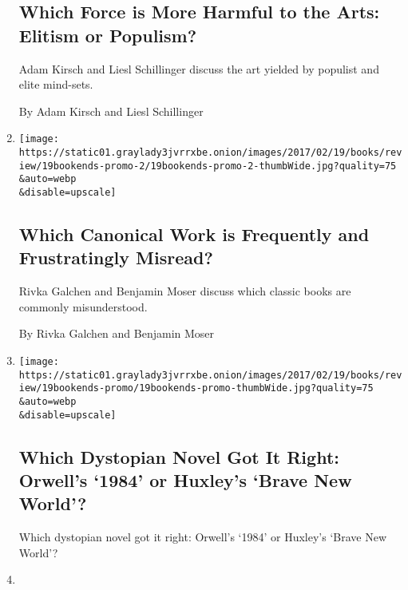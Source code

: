 \begin{enumerate}
  \hypertarget{which-force-is-more-harmful-to-the-arts-elitism-or-populism}{%
  \subsection{Which Force is More Harmful to the Arts: Elitism or
  Populism?}\label{which-force-is-more-harmful-to-the-arts-elitism-or-populism}}

  Adam Kirsch and Liesl Schillinger discuss the art yielded by populist
  and elite mind-sets.

  By Adam Kirsch and Liesl Schillinger
\item
  \href{/2017/02/17/books/review/which-canonical-work-is-frequently-and-frustratingly-misread.html}{}

  \texttt{[image: https://static01.graylady3jvrrxbe.onion/images/2017/02/19/books/review/19bookends-promo-2/19bookends-promo-2-thumbWide.jpg?quality=75\\\&auto=webp\\\&disable=upscale]}

  \hypertarget{which-canonical-work-is-frequently-and-frustratingly-misread}{%
  \subsection{Which Canonical Work is Frequently and Frustratingly
  Misread?}\label{which-canonical-work-is-frequently-and-frustratingly-misread}}

  Rivka Galchen and Benjamin Moser discuss which classic books are
  commonly misunderstood.

  By Rivka Galchen and Benjamin Moser
\item
  \href{/2017/02/13/books/review/which-dystopian-novel-got-it-right-orwells-1984-or-huxleys-brave-new-world.html}{}

  \texttt{[image: https://static01.graylady3jvrrxbe.onion/images/2017/02/19/books/review/19bookends-promo/19bookends-promo-thumbWide.jpg?quality=75\\\&auto=webp\\\&disable=upscale]}

  \hypertarget{which-dystopian-novel-got-it-right-orwells-1984-or-huxleys-brave-new-world}{%
  \subsection{Which Dystopian Novel Got It Right: Orwell's `1984' or
  Huxley's `Brave New
  World'?}\label{which-dystopian-novel-got-it-right-orwells-1984-or-huxleys-brave-new-world}}

  Which dystopian novel got it right: Orwell's `1984' or Huxley's `Brave
  New World'?
\item
  \href{/2017/01/03/books/review/is-it-possible-for-a-writer-to-be-objective.html}{}


\end{enumerate}
